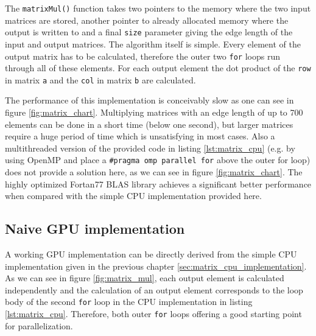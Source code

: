 

The \lstinline!matrixMul()! function takes two pointers to the memory where the two input matrices are stored, another pointer to already allocated memory where the output is written to and a final \lstinline!size! parameter giving the edge length of the input and output matrices.
The algorithm itself is simple. Every element of the output matrix has to be calculated, therefore the outer two \lstinline!for! loops run through all of these elements. For each output element the dot product of the \lstinline!row! in matrix \lstinline!a! and the \lstinline!col! in matrix \lstinline!b! are calculated.

The performance of this implementation is conceivably slow as one can see in figure \ref{fig:matrix_chart}. Multiplying matrices with an edge length of up to 700 elements can be done in a short time (below one second), but larger matrices require a huge period of time which is unsatisfying in most cases.
Also a multithreaded version of the provided code in listing \ref{lst:matrix_cpu} (e.g. by using OpenMP and place a \lstinline!#pragma omp parallel for! above the outer for loop) does not provide a solution here, as we can see in figure \ref{fig:matrix_chart}.
The highly optimized Fortan77 BLAS library \cite{blas_lib} achieves a significant better performance when compared with the simple CPU implementation provided here.

\subsection{Naive GPU implementation}

A working GPU implementation can be directly derived from the simple CPU implementation given in the previous chapter \ref{sec:matrix_cpu_implementation}. As we can see in figure \ref{fig:matrix_mul}, each output element is calculated independently and the calculation of an output element corresponds to the loop body of the second \lstinline!for! loop in the CPU implementation in listing \ref{lst:matrix_cpu}. Therefore, both outer \lstinline!for! loops offering a good starting point for parallelization. 

